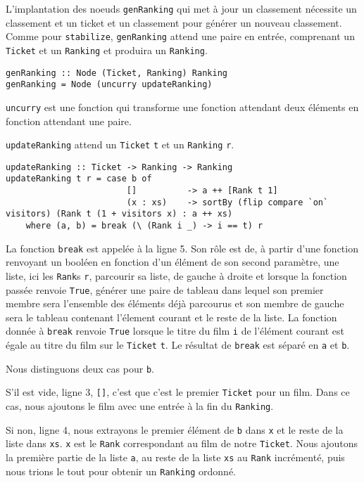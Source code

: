 \documentclass{llncs}
\begin{document}
L'implantation des noeuds \lstinline{genRanking} qui met à jour un classement
nécessite un classement et un ticket et un classement pour générer un nouveau classement.
Comme pour \lstinline{stabilize}, \lstinline{genRanking} attend une paire en
entrée, comprenant un \lstinline{Ticket} et un \lstinline{Ranking} et produira
un \lstinline{Ranking}.
\begin{lstlisting}
genRanking :: Node (Ticket, Ranking) Ranking
genRanking = Node (uncurry updateRanking)
\end{lstlisting}
\lstinline{uncurry} est une fonction qui transforme une fonction attendant deux éléments
en fonction attendant une paire.

\lstinline{updateRanking} attend un \lstinline{Ticket} \lstinline{t} et un
\lstinline{Ranking} \lstinline{r}.
\begin{lstlisting}
updateRanking :: Ticket -> Ranking -> Ranking
updateRanking t r = case b of
                        []          -> a ++ [Rank t 1]
                        (x : xs)    -> sortBy (flip compare `on` visitors) (Rank t (1 + visitors x) : a ++ xs)
    where (a, b) = break (\ (Rank i _) -> i == t) r
\end{lstlisting}
La fonction \lstinline{break} est appelée à la ligne 5.
Son rôle est de, à partir d'une fonction renvoyant un booléen en fonction d'un
élément de son second paramètre, une liste, ici les \lstinline{Rank}s \lstinline{r},
parcourir sa liste, de gauche à droite et lorsque la fonction passée renvoie
\lstinline{True}, générer une paire de tableau dans lequel son premier membre
sera l'ensemble des éléments déjà parcourus et son membre de gauche sera le
tableau contenant l'élement courant et le reste de la liste.
La fonction donnée à \lstinline{break} renvoie \lstinline{True} lorsque le titre
du film \lstinline{i} de l'élément courant est égale au titre du film sur le
\lstinline{Ticket} \lstinline{t}.
Le résultat de \lstinline{break} est séparé en \lstinline{a} et \lstinline{b}.

Nous distinguons deux cas pour \lstinline{b}.

S'il est vide, ligne 3, \lstinline{[]}, c'est que c'est le premier \lstinline{Ticket}
pour un film.
Dans ce cas, nous ajoutons le film avec une entrée à la fin du \lstinline{Ranking}.

Si non, ligne 4, nous extrayons le premier élément de \lstinline{b} dans \lstinline{x}
et le reste de la liste dans \lstinline{xs}.
\lstinline{x} est le \lstinline{Rank} correspondant au film de notre \lstinline{Ticket}.
Nous ajoutons la première partie de la liste \lstinline{a}, au reste de la liste
\lstinline{xs} au \lstinline{Rank} incrémenté, puis nous trions le tout pour obtenir
un \lstinline{Ranking} ordonné.
\end{document}
